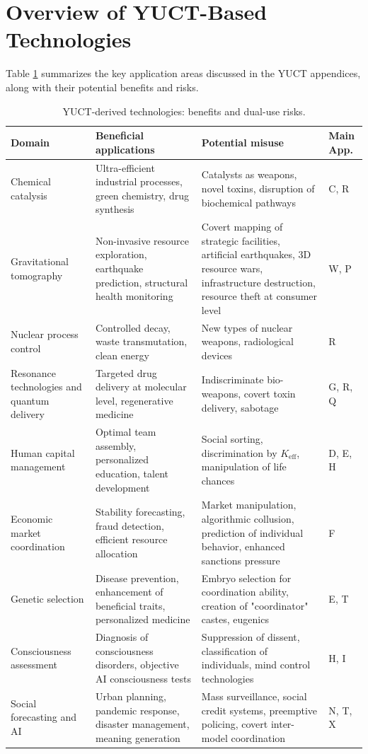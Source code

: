 \documentclass[12pt,a4paper]{article}
\theoremstyle{remark}
\newcommand{\Keff}{K_{\mathrm{eff}}}
\begin{document}
	\section{Overview of YUCT-Based Technologies}
	\label{sec:overview}
	
	Table \ref{tab:tech-summary} summarizes the key application areas discussed in the YUCT appendices, along with their potential benefits and risks.
	
	\begin{table}[htbp]
		\centering
		\caption{YUCT-derived technologies: benefits and dual-use risks.}
		\label{tab:tech-summary}
		\small
		\begin{tabularx}{\textwidth}{p{2.8cm}Xp{3.5cm}p{2.5cm}}
			\toprule
			\textbf{Domain} & \textbf{Beneficial applications} & \textbf{Potential misuse} & \textbf{Main App.} \\
			\midrule
			Chemical catalysis & Ultra-efficient industrial processes, green chemistry, drug synthesis & Catalysts as weapons, novel toxins, disruption of biochemical pathways & C, R \\
			Gravitational tomography & Non-invasive resource exploration, earthquake prediction, structural health monitoring & Covert mapping of strategic facilities, artificial earthquakes, 3D resource wars, infrastructure destruction, resource theft at consumer level & W, P \\
			Nuclear process control & Controlled decay, waste transmutation, clean energy & New types of nuclear weapons, radiological devices & R \\
			Resonance technologies and quantum delivery & Targeted drug delivery at molecular level, regenerative medicine & Indiscriminate bio-weapons, covert toxin delivery, sabotage & G, R, Q \\
			Human capital management & Optimal team assembly, personalized education, talent development & Social sorting, discrimination by \(\Keff\), manipulation of life chances & D, E, H \\
			Economic market coordination & Stability forecasting, fraud detection, efficient resource allocation & Market manipulation, algorithmic collusion, prediction of individual behavior, enhanced sanctions pressure & F \\
			Genetic selection & Disease prevention, enhancement of beneficial traits, personalized medicine & Embryo selection for coordination ability, creation of "coordinator" castes, eugenics & E, T \\
			Consciousness assessment & Diagnosis of consciousness disorders, objective AI consciousness tests & Suppression of dissent, classification of individuals, mind control technologies & H, I \\
			Social forecasting and AI & Urban planning, pandemic response, disaster management, meaning generation & Mass surveillance, social credit systems, preemptive policing, covert inter-model coordination & N, T, X \\
			\bottomrule
		\end{tabularx}
	\end{table}
	
\end{document}
